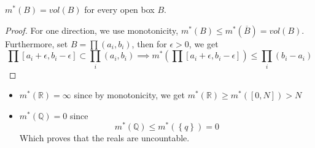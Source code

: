 \documentclass[../main.tex]{subfiles}
\begin{document}
\begin{crly}
$m^{*}(B)= vol( B) $ for every open box $B$.
\end{crly}
\begin{proof}
For one direction, we use monotonicity,
$m^{*}( B) \leq m^{*}( \overline{B}) = vol( B) $.\\
Furthermore, set $ B= \prod ( a_i,b_i) $, then for $\epsilon>0$, we get
\[ 
\prod [ a_i+\epsilon,b_i-\epsilon] \subset \prod_i ( a_i,b_i) \implies m^{*}( \prod [ a_i+\epsilon,b_i-\epsilon]  ) \leq \prod_i ( b_i-a_i) 
\]

\end{proof}
\begin{exemple}
	\begin{itemize}
	\item 
$m^{*}( \mathbb{R}) = \infty $ since by monotonicity, we get $m^{*}( \mathbb{R}) \geq m^{*}( [ 0,N] ) >N$ 
\item $m^{*}( \mathbb{Q}) =0 $ since
	\[ 
	m^{*}( \mathbb{Q}) \leq m^{*}( \left\{ q \right\} ) =0
	\]
	Which proves that the reals are uncountable.
	\end{itemize}
	
\end{exemple}
\end{document}
